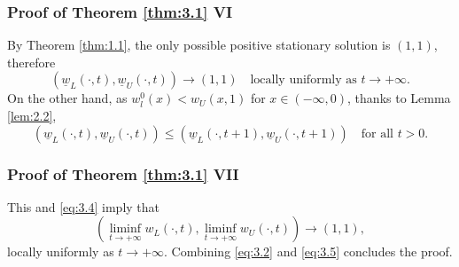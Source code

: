 \begin{frame}
    \frametitle{Proof of Theorem \ref{thm:3.1} VI}
    \begin{proofc}
        By Theorem \ref{thm:1.1}, the only possible positive stationary solution is \((1, 1)\), therefore
        \begin{equation}
            (\underline{w}_{L}(\cdot, t), \underline{w}_{U}(\cdot, t)) \to (1, 1) \quad \text{locally uniformly as } t \to +\infty.
            \label{eq:3.4}
        \end{equation}
        On the other hand, as \(w_l^0(x) < w_U(x, 1)\) for \(x \in (-\infty, 0)\), thanks to Lemma \ref{lem:2.2},
        \[
            (\underline{w}_L(\cdot, t), \underline{w}_U(\cdot, t)) \leq (\underline{w}_L(\cdot, t + 1), \underline{w}_U(\cdot, t + 1)) \quad \text{for all } t > 0.
        \]
    \end{proofc}
\end{frame}


\begin{frame}
    \frametitle{Proof of Theorem \ref{thm:3.1} VII}
    \begin{proofe}
        This and \eqref{eq:3.4} imply that
        \begin{equation}
            (\liminf_{t \to +\infty} w_L(\cdot, t), \liminf_{t \to +\infty} w_U(\cdot, t)) \to (1, 1),
            \label{eq:3.5}
        \end{equation}
        locally uniformly as \(t \to +\infty\).
        Combining \eqref{eq:3.2} and \eqref{eq:3.5} concludes the proof.
    \end{proofe}
\end{frame}
        